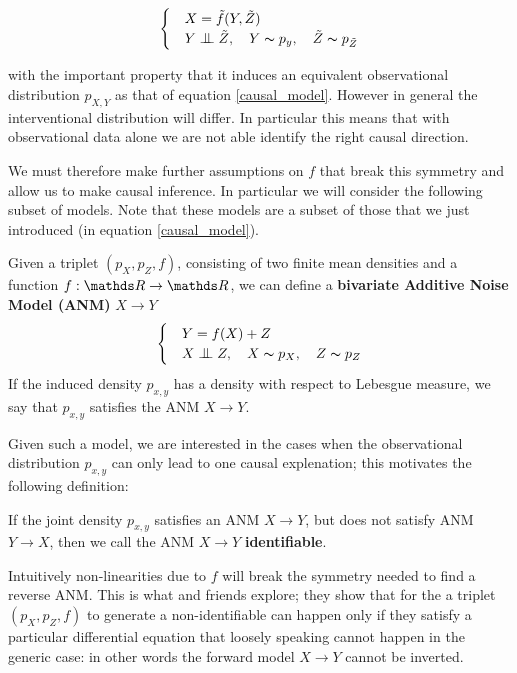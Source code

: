 \begin{equation}
    \begin{cases} 
        & X = \tilde{f}(Y, \tilde{Z}) \\
        & Y \bigCI \tilde{Z},\quad Y \thicksim p_y,\quad \tilde{Z} \thicksim p_{\tilde{Z}}  
     \end{cases}
\end{equation}

with the important property that it induces an equivalent observational distribution $p_{X, Y}$ as that of 
equation \ref{causal_model}. However in general the interventional distribution will differ. In particular 
this means that with observational data alone we are not able identify the right causal direction.

We must therefore make further assumptions on $f$ that break this symmetry and allow us to make causal inference.
In particular we will consider the following subset of models. Note that these models are a subset of those 
that we just introduced (in equation \ref{causal_model}).

\begin{definition} Given a triplet $(p_X, p_Z, f)$, consisting of two finite mean densities and a function
$f: \R \rightarrow \R$, we can define a \textbf{bivariate Additive Noise Model (ANM)} $X \rightarrow Y$
\[
    \begin{cases} 
        & Y = f(X) + Z \\
        & X \bigCI Z,\quad X \thicksim p_X,\quad Z \thicksim p_{Z}  
     \end{cases}  
\]
If the induced density $p_{x, y}$ has a density with respect to Lebesgue measure, we say that $p_{x, y}$
satisfies the ANM $X \rightarrow Y$.
\end{definition}

Given such a model, we are interested in the cases when the observational distribution $p_{x, y}$ can only
lead to one causal explenation; this motivates the following definition:

\begin{definition} If the joint density $p_{x, y}$ satisfies an ANM $X \rightarrow Y$, but does not satisfy
ANM $Y \rightarrow X$, then we call the ANM $X \rightarrow Y$ \textbf{identifiable}. 
\end{definition}

Intuitively non-linearities due to $f$ will break the symmetry needed to find a reverse ANM. This is what
\cite{hoyer2009nonlinear} and friends explore; they show that for the 
a triplet $(p_X, p_Z, f)$ to generate a non-identifiable can happen only if they satisfy a particular 
differential equation that loosely speaking cannot happen in the generic case: in other words the forward 
model $X \rightarrow Y$ cannot be inverted. 

